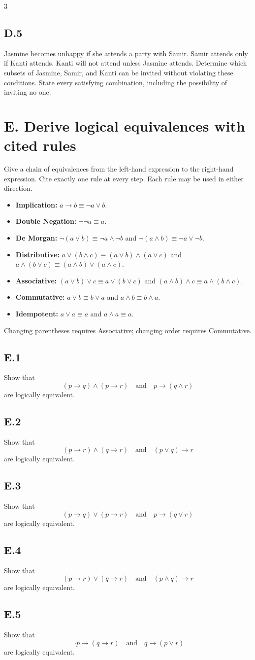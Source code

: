 \documentclass{article}
\newcommand{\problem}[1]{%
  \par
  \subsection*{#1}%
}
\begin{document}
\begin{multicols}{3}
\problem{D.5}
Jasmine becomes unhappy if she attends a party with Samir. Samir attends only
if Kanti attends. Kanti will not attend unless Jasmine attends. Determine which
subsets of Jasmine, Samir, and Kanti can be invited without violating these
conditions. State every satisfying combination, including the possibility of
inviting no one.
\section*{E. Derive logical equivalences with cited rules}

\begin{tcolorbox}[title=Permitted rules for E.1--E.5]
Give a chain of equivalences from the left-hand expression to the right-hand
expression. Cite exactly one rule at every step. Each rule may be used in either
direction.
\begin{itemize}
  \item \textbf{Implication:} $a\to b\equiv\neg a\lor b$.
  \item \textbf{Double Negation:} $\neg\neg a\equiv a$.
  \item \textbf{De Morgan:}
        $\neg(a\lor b)\equiv\neg a\land\neg b$ and
        $\neg(a\land b)\equiv\neg a\lor\neg b$.
  \item \textbf{Distributive:}
        $a\lor(b\land c)\equiv(a\lor b)\land(a\lor c)$ and
        $a\land(b\lor c)\equiv(a\land b)\lor(a\land c)$.
  \item \textbf{Associative:}
        $(a\lor b)\lor c\equiv a\lor(b\lor c)$ and
        $(a\land b)\land c\equiv a\land(b\land c)$.
  \item \textbf{Commutative:}
        $a\lor b\equiv b\lor a$ and $a\land b\equiv b\land a$.
  \item \textbf{Idempotent:}
        $a\lor a\equiv a$ and $a\land a\equiv a$.
\end{itemize}
Changing parentheses requires Associative; changing order requires
Commutative.
\end{tcolorbox}

\problem{E.1}
Show that
\[
  (p\to q)\land(p\to r)
  \quad\text{and}\quad
  p\to(q\land r)
\]
are logically equivalent.

\problem{E.2}
Show that
\[
  (p\to r)\land(q\to r)
  \quad\text{and}\quad
  (p\lor q)\to r
\]
are logically equivalent.

\problem{E.3}
Show that
\[
  (p\to q)\lor(p\to r)
  \quad\text{and}\quad
  p\to(q\lor r)
\]
are logically equivalent.

\problem{E.4}
Show that
\[
  (p\to r)\lor(q\to r)
  \quad\text{and}\quad
  (p\land q)\to r
\]
are logically equivalent.

\problem{E.5}
Show that
\[
  \neg p\to(q\to r)
  \quad\text{and}\quad
  q\to(p\lor r)
\]
are logically equivalent.
\end{multicols}
\end{document}
